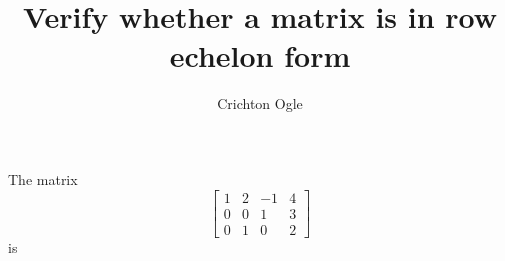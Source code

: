 \documentclass{ximera}
\title{Verify whether a matrix is in row echelon form}
\author{Crichton Ogle}
\begin{document}
\begin{question} The matrix
\[
\begin{bmatrix}
1 & 2 & -1 & 4\\
0 & 0 & 1 & 3\\
0 & 1 & 0 & 2
\end{bmatrix}\]
is
\begin{multipleChoice}
\end{multipleChoice}
\end{question}
\end{document}
